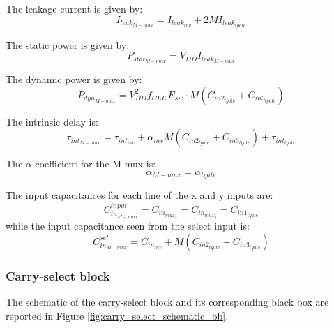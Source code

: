 The leakage current is given by:
\begin{equation}
I_{leak_{M-mux}} = I_{leak_{inv}} + 2M I_{leak_{tgate}}
\end{equation}

The static power is given by:
\begin{equation}
P_{stat_{M-mux}} = V_{DD} I_{leak_{M-mux}}
\end{equation}

The dynamic power is given by:
\begin{equation}
P_{dyn_{M-mux}} = V_{DD}^2 f_{CLK} E_{sw} \cdot M (C_{in2_{tgate}} + C_{in3_{tgate}})
\end{equation}

The intrinsic delay is:
\begin{equation}
\tau_{int_{M-mux}} = \tau_{int_{inv}} + \alpha_{inv} M (C_{in2_{tgate}} + C_{in3_{tgate}}) + \tau_{int_{tgate}}
\end{equation}

The $\alpha$ coefficient for the M-mux is: 
\begin{equation}
\alpha_{M-mux} = \alpha_{tgate}
\end{equation}



The input capacitances for each line of the x and y inputs are:
\begin{equation}
C_{in_{M-mux}}^{input} = C_{in_{mux_x}} = C_{in_{mux_y}} = C_{in1_{tgate}} 
\end{equation}
while the input capacitance seen from the select input is:
\begin{equation}
C_{in_{M-mux}}^{sel} = C_{in_{inv}} + M( C_{in2_{tgate}} + C_{in3_{tgate}})
\end{equation}





\subsubsection{Carry-select block}
The schematic of the carry-select block and its corresponding black box are reported in Figure \ref{fig:carry_select_schematic_bb}.

